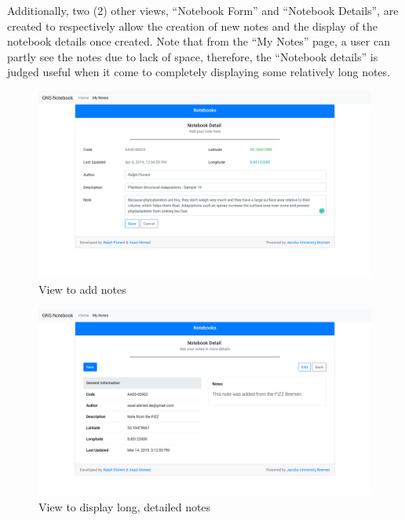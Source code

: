 \noindent
Additionally, two (2) other views, “Notebook Form” and “Notebook Details”,  are created to  respectively allow the creation of new notes and the display of  the notebook details once created. Note that from the “My Notes” page, a user can partly see the notes due to lack of space, therefore, the “Notebook details” is judged useful when it come to completely displaying some  relatively long notes.\\

\begin{figure}
    \centering
        \includegraphics[width=1\textwidth]{images/screenshots/gns-ui-screenshot_notebook-form.png}
        \caption{View to add notes}
\end{figure}

\begin{figure}
    \centering
        \includegraphics[width=1\textwidth]{images/screenshots/gns-ui-screenshot_notebook-details.png}
        \caption{View to display long, detailed notes}
\end{figure}
